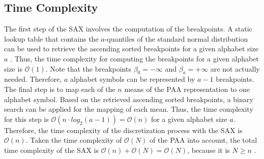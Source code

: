 \subsection*{Time Complexity}
The first step of the \ac{SAX} involves the computation of the breakpoints. A static lookup table that contains the $a$-quantiles of the standard normal distribution can be used to retrieve the ascending sorted breakpoints for a given alphabet size $a$ \cite{SAX_Lin}. Thus, the time complexity for computing the breakpoints for a given alphabet size is $\mathcal{O}(1)$. Note that the breakpoints $\beta_0 = -\infty$ and $\beta_a = +\infty$ are not actually needed. Therefore, $a$ alphabet symbols can be represented by $a-1$ breakpoints. \newline
The final step is to map each of the $n$ means of the \ac{PAA} representation to one alphabet symbol. Based on the retrieved ascending sorted breakpoints, a binary search can be applied for the mapping of each mean. Thus, the time complexity for this step is $\mathcal{O}(n \cdot log_{2}(a-1)) = \mathcal{O}(n)$ for a given alphabet size $a$. \newline
Therefore, the time complexity of the discretization process with the \ac{SAX} is $\mathcal{O}(n)$.
Taken the time complexity of $\mathcal{O}(N)$ of the \ac{PAA} into account, the total time complexity of the \ac{SAX} is $\mathcal{O}(n) + \mathcal{O}(N) = \mathcal{O}(N)$, because it is $N \geq n$ \cite{SFA}.